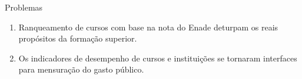 \documentclass{beamer}
\begin{document}
\begin{frame}{Problemas}
\begin{enumerate}
	\item Ranqueamento de cursos com base na nota do Enade deturpam os reais propósitos da formação superior.
	\item Os indicadores de desempenho de cursos e instituições se tornaram interfaces para mensuração do gasto público.
	\end{enumerate}
\end{frame}
\end{document}

